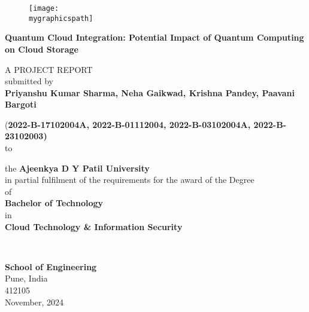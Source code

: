 \documentclass[12pt,a4paper]{article}
\newcommand{\mygraphicspath}{D:/SEM-5/FSDC/quantum-cloud-integration/images/ADYPU_LOGO.png}
\newcommand{\vname}{Priyanshu Kumar Sharma, Neha Gaikwad, Krishna Pandey, Paavani Bargoti}
\newcommand{\vregisternumber}{2022-B-17102004A, 2022-B-01112004, 2022-B-03102004A, 2022-B-23102003}
\newcommand{\vspecialization}{Cloud Technology \& Information Security}
\newcommand{\vdate}{November, 2024}
\newcommand{\vcollege}{Ajeenkya D Y Patil University}
\newcommand{\vtitle}{Quantum Cloud Integration: Potential Impact of Quantum Computing on Cloud Storage}
\newcommand{\department}{School of Engineering}
\newcommand{\vaddresslinei}{Pune, India}
\newcommand{\vaddresslineii}{412105}
\begin{document}
\thispagestyle{empty}
\begin{center}
    {\begin{figure}[!h]
        \centering
        \texttt{[image: \\mygraphicspath]}
    \end{figure}}


    {\large {\bfseries {\vtitle} \par}}


    \vspace{3\baselineskip}
    
    A PROJECT REPORT\\[0.5cm]
submitted by\\[0.5cm]
    {\fontsize{14}{20}\selectfont \bfseries \vname}

{(\bfseries \vregisternumber)}
\quad\\
to
\begin{spacing}{1.25}
the \textbf{\vcollege}\\

in partial fulfilment of the requirements for the award of the Degree\\
of\\
\textbf{Bachelor of Technology}\\
in\\
\textbf{\vspecialization}
\end{spacing}
%
\quad\\[0.5cm]

\begin{spacing}{1.25}
{\fontsize{14}{20}\selectfont\bfseries \department }\\

\vaddresslinei\\
\vaddresslineii\\
{\fontsize{12}{20}\selectfont \vdate}\\
\end{spacing}
\end{center}
\newpage
\end{document}
